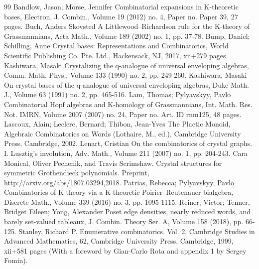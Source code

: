 \begin{thebibliography}{99}
 Bandlow, Jason; Morse, Jennifer Combinatorial expansions in K-theoretic bases, Electron. J. Combin., Volume 19 (2012) no. 4, Paper no. Paper 39, 27 pages.
 Buch, Anders Skovsted A Littlewood–Richardson rule for the K-theory of Grassmannians, Acta Math., Volume 189 (2002) no. 1, pp. 37-78.
 Bump, Daniel; Schilling, Anne Crystal bases: Representations and Combinatorics, World Scientific Publishing Co. Pte. Ltd., Hackensack, NJ, 2017, xii+279 pages.
 Kashiwara, Masaki Crystalizing the q-analogue of universal enveloping algebras, Comm. Math. Phys., Volume 133 (1990) no. 2, pp. 249-260.
 Kashiwara, Masaki On crystal bases of the q-analogue of universal enveloping algebras, Duke Math. J., Volume 63 (1991) no. 2, pp. 465-516.
 Lam, Thomas; Pylyavskyy, Pavlo Combinatorial Hopf algebras and K-homology of Grassmannians, Int. Math. Res. Not. IMRN, Volume 2007 (2007) no. 24, Paper no. Art. ID rnm125, 48 pages.
 Lascoux, Alain; Leclerc, Bernard; Thibon, Jean-Yves The Plactic Monoid, Algebraic Combinatorics on Words (Lothaire, M., ed.), Cambridge University Press, Cambridge, 2002.
 Lenart, Cristian On the combinatorics of crystal graphs. I. Lusztig’s involution, Adv. Math., Volume 211 (2007) no. 1, pp. 204-243.
 Cara Monical, Oliver Pechenik, and Travis Scrimshaw. Crystal structures for symmetric Grothendieck polynomials. Preprint, http://arxiv.org/abs/1807.03294,2018.
 Patrias, Rebecca; Pylyavskyy, Pavlo Combinatorics of K-theory via a K-theoretic Poirier–Reutenauer bialgebra, Discrete Math., Volume 339 (2016) no. 3, pp. 1095-1115.
 Reiner, Victor; Tenner, Bridget Eileen; Yong, Alexander Poset edge densities, nearly reduced words, and barely set-valued tableaux, J. Combin. Theory Ser. A, Volume 158 (2018), pp. 66-125.
 Stanley, Richard P. Enumerative combinatorics. Vol. 2, Cambridge Studies in Advanced Mathematics, 62, Cambridge University Press, Cambridge, 1999, xii+581 pages (With a foreword by Gian-Carlo Rota and appendix 1 by Sergey Fomin).
\end{thebibliography}
